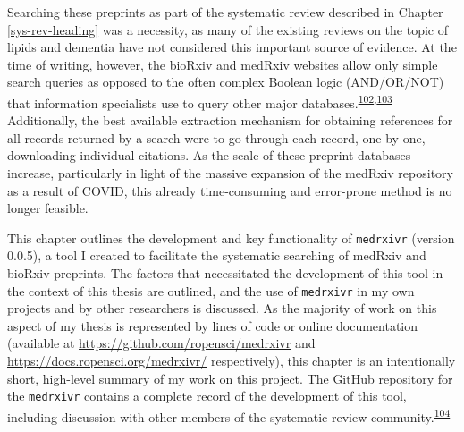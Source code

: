 \documentclass[a4paper, twoside]{templates/ociamthesis}
\begin{document}
Searching these preprints as part of the systematic review described in Chapter \ref{sys-rev-heading} was a necessity, as many of the existing reviews on the topic of lipids and dementia have not considered this important source of evidence. At the time of writing, however, the bioRxiv and medRxiv websites allow only simple search queries as opposed to the often complex Boolean logic (AND/OR/NOT) that information specialists use to query other major databases.\textsuperscript{\protect\hyperlink{ref-bramer2018a}{102},\protect\hyperlink{ref-gusenbauer2020}{103}} Additionally, the best available extraction mechanism for obtaining references for all records returned by a search were to go through each record, one-by-one, downloading individual citations. As the scale of these preprint databases increase, particularly in light of the massive expansion of the medRxiv repository as a result of COVID, this already time-consuming and error-prone method is no longer feasible.

This chapter outlines the development and key functionality of \texttt{medrxivr} (version 0.0.5), a tool I created to facilitate the systematic searching of medRxiv and bioRxiv preprints. The factors that necessitated the development of this tool in the context of this thesis are outlined, and the use of \texttt{medrxivr} in my own projects and by other researchers is discussed. As the majority of work on this aspect of my thesis is represented by lines of code or online documentation (available at \url{https://github.com/ropensci/medrxivr} and \url{https://docs.ropensci.org/medrxivr/} respectively), this chapter is an intentionally short, high-level summary of my work on this project. The GitHub repository for the \texttt{medrxivr} contains a complete record of the development of this tool, including discussion with other members of the systematic review community.\textsuperscript{\protect\hyperlink{ref-zotero-15029}{104}}

~
\end{document}
